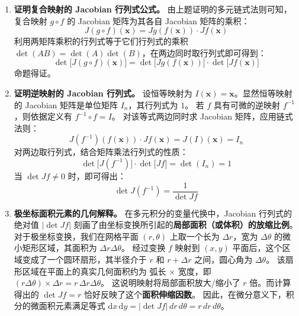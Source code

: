 \documentclass[lang=cn,11pt]{elegantbook}
\begin{document}
\begin{solution}
\begin{enumerate}
  \item[(1)] \textbf{证明复合映射的 Jacobian 行列式公式。}
  由上题证明的多元链式法则可知，复合映射 $g \circ f$ 的 Jacobian 矩阵为其各自 Jacobian 矩阵的乘积：
  \[
  J(g \circ f)(\boldsymbol x) = Jg(f(\boldsymbol x)) \cdot Jf(\boldsymbol x)
  \]
  利用两矩阵乘积的行列式等于它们行列式的乘积 $\det(AB) = \det(A)\det(B)$，在两边同时取行列式即可得到：
  \[
  \det \bigl[J(g \circ f)(\boldsymbol x)\bigr] = \det \bigl[Jg(f(\boldsymbol x))\bigr] \cdot \det \bigl[Jf(\boldsymbol x)\bigr]
  \]
  命题得证。

  \item[(2)] \textbf{证明逆映射的 Jacobian 行列式。}
  设恒等映射为 $I(\boldsymbol x) = \boldsymbol x$。显然恒等映射的 Jacobian 矩阵是单位矩阵 $I_n$，其行列式为 $1$。
  若 $f$ 具有可微的逆映射 $f^{-1}$，则依据定义有 $f^{-1} \circ f = I$。
  对该等式两边同时求 Jacobian 矩阵，应用链式法则：
  \[
  J(f^{-1})(f(\boldsymbol x)) \cdot Jf(\boldsymbol x) = J(I)(\boldsymbol x) = I_n
  \]
  对两边取行列式，结合矩阵乘法行列式的性质：
  \[
  \det\bigl[J(f^{-1})\bigr] \cdot \det\bigl[Jf\bigr] = \det(I_n) = 1
  \]
  当 $\det Jf \neq 0$ 时，即可得出：
  \[
  \det J(f^{-1}) = \frac{1}{\det Jf}
  \]
  
  \item[(3)] \textbf{极坐标面积元素的几何解释。}
  在多元积分的变量代换中，Jacobian 行列式的绝对值 $|\det Jf|$ 刻画了由坐标变换所引起的\textbf{局部面积（或体积）的放缩比例}。
  对于极坐标变换，我们在网格平面 $(r, \theta)$ 上取一个长为 $\Delta r$，宽为 $\Delta \theta$ 的微小矩形区域，其面积为 $\Delta r \Delta \theta$。
  经过变换 $f$ 映射到 $(x, y)$ 平面后，这个区域变成了一个圆环扇形，其半径介于 $r$ 和 $r+\Delta r$ 之间，圆心角为 $\Delta \theta$。
  该扇形区域在平面上的真实几何面积约为 弧长 $\times$ 宽度，即 $(r\Delta\theta) \times \Delta r = r\,\Delta r\Delta\theta$。
  这说明映射将局部面积放大/缩小了 $r$ 倍。而计算得出的 $\det Jf = r$ 恰好反映了这个\textbf{面积伸缩因数}。
  因此，在微分意义下，积分的微面积元素满足等式 $\mathrm{d}x\,\mathrm{d}y = |\det Jf|\,dr\,d\theta = r\,dr\,d\theta$。
\end{enumerate}
\end{solution}
\end{document}
